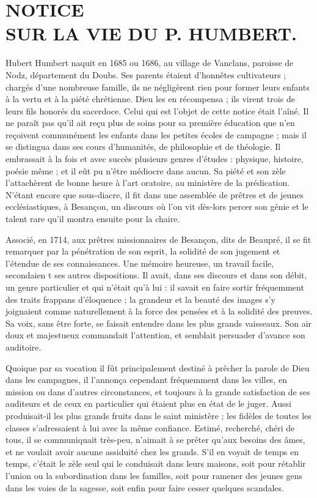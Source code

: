 \documentclass[instructions.tex]{subfiles}
\begin{document}
\cleardoublepage
{}
\section*{NOTICE\\
\large SUR LA VIE DU P. HUMBERT.}

Hubert Humbert naquit en 1685 ou 1686, au village de Vanclans, paroisse de Nodz, département du Doubs. Ses parents étaient d’honnêtes cultivateurs ; chargés d’une nombreuse famille, ils ne négligèrent rien pour former leurs enfants à la vertu et à la piété chrétienne. Dieu les en récompensa ; ils virent trois de leurs fils honorés du sacerdoce. Celui qui est l’objet de cette notice était l’aîné. Il ne paraît pas qu’il ait reçu plus de soins pour sa première éducation que n’en reçoivent communément les enfants dans les petites écoles de campagne ; mais il se distingua dans ses cours d’humanités, de philosophie et de théologie. Il embrassait à la fois et avec succès plusieurs genres d’études : physique, histoire, poésie même ; et il eût pu n’être médiocre dans aucun. Sa piété et son zèle l’attachèrent de bonne heure à l’art oratoire, au ministère de la prédication. N’étant encore que sous-diacre, il fit dans une assemblée de prêtres et de jeunes ecclésiastiques, à Besançon, un discours où l’on vit dès-lors percer son génie et le talent rare qu’il montra ensuite pour la chaire.

Associé, en 1714, aux prêtres missionnaires de Besançon, dits de Beaupré, il se fit remarquer par la pénétration de son esprit, la solidité de son jugement et l’étendue de ses connaissances. Une mémoire heureuse, un travail facile, secondaien t ses autres dispositions. Il avait, dans ses discours et dans son débit, un genre particulier et qui n’était qu’à lui : il savait en faire sortir fréquemment des traits frappans d’éloquence ; la grandeur et la beauté des images s’y joignaient comme naturellement à la force des pensées et à la solidité des preuves. Sa voix, sans être forte, se faisait entendre dans les plus grands vaisseaux. Son air doux et majestueux commandait l’attention, et semblait persuader d’avance son auditoire.

Quoique par sa vocation il fût principalement destiné à prêcher la parole de Dieu dans les campagnes, il l’annonça cependant fréquemment dans les villes, en mission ou dans d’autres circonstances, et toujours à la grande satisfaction de ses auditeurs et de ceux en particulier qui étaient plus en état de le juger. Aussi produisait-il les plus grands fruits dans le saint ministère ; les fidèles de toutes les classes s’adressaient à lui avec la même confiance. Estimé, recherché, chéri de tous, il se communiquait très-peu, n’aimait à se prêter qu’aux besoins des âmes, et ne voulait avoir aucune assiduité chez les grands. S’il en voyait de temps en temps, c’était le zèle seul qui le conduisait dans leurs maisons, soit pour rétablir l’union ou la subordination dans les familles, soit pour ramener des jeunes gens dans les voies de la sagesse, soit enfin pour faire cesser quelques scandales.
\end{document}
